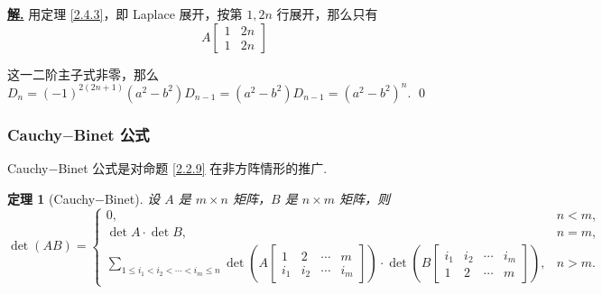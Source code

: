 \documentclass[10pt,openany]{article}
\theoremstyle{thmstyle} %
\newtheorem{theorem}{定理}[subsection]
\theoremstyle{defstyle} %
\theoremstyle{prostyle} %
\theoremstyle{exastyle}
\theoremstyle{remstyle}
\newenvironment{solution}{\par\underline{\textbf{解.}} \;\fangsong}{\qed\par}
\begin{document}
\begin{solution}
	用定理 \ref{2.4.3}，即 Laplace 展开，按第 \( 1, 2n \) 行展开，那么只有
	\[ A\begin{bmatrix}
		1 & 2n \\
		1 & 2n
	\end{bmatrix} \]
	
	这一二阶主子式非零，那么 \( D_n=(-1)^{2(2n+1)}(a^2-b^2)D_{n-1}=(a^2-b^2)D_{n-1}=(a^2-b^2)^n \).
\end{solution}

\subsubsection{Cauchy\(-\)Binet 公式}

Cauchy\(-\)Binet 公式是对命题 \ref{2.2.9} 在非方阵情形的推广.

\begin{theorem}[Cauchy\(-\)Binet] \label{2.4.5}
	设 \( A \) 是 \( m \times n \) 矩阵，\( B \) 是 \( n \times m \) 矩阵，则
	\[
	\det(AB) =
	\left\{
	\begin{array}{lr}
		0, & n < m, \\
		\det A \cdot \det B, & n = m, \\
		\displaystyle
		\sum_{1 \leq i_1 < i_2 < \cdots < i_m \leq n}
		\det\left(
		A\begin{bmatrix}
			1 & 2 & \cdots & m \\
			i_1 & i_2 & \cdots & i_m
		\end{bmatrix}
		\right)
		\cdot
		\det\left(
		B\begin{bmatrix}
			i_1 & i_2 & \cdots & i_m \\
			1 & 2 & \cdots & m
		\end{bmatrix}
		\right), & n > m.
	\end{array}
	\right.
	\]
\end{theorem}
\end{document}
